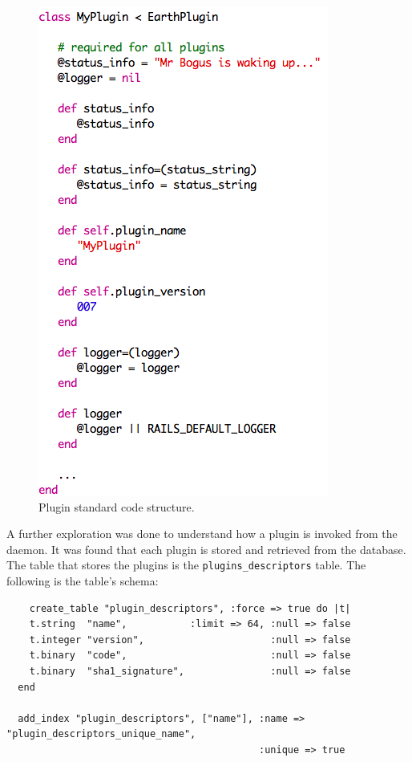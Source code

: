 \documentclass{article}
\begin{document}
\begin{figure}[ht]
    \centering
    \includegraphics[scale=0.7]{plugin_standard_codes.png}
    \caption{Plugin standard code structure.}
    \label{fig:plugin}
\end{figure}

A further exploration was done to understand how a plugin is invoked from the daemon. It was found that each plugin is stored and retrieved from the database. The table that stores the plugins is the \texttt{plugins\_descriptors} table. The following is the table's schema:

\begin{verbatim}
    create_table "plugin_descriptors", :force => true do |t|
    t.string  "name",           :limit => 64, :null => false
    t.integer "version",                      :null => false
    t.binary  "code",                         :null => false
    t.binary  "sha1_signature",               :null => false
  end

  add_index "plugin_descriptors", ["name"], :name => "plugin_descriptors_unique_name", 
                                            :unique => true
\end{verbatim}
\end{document}
